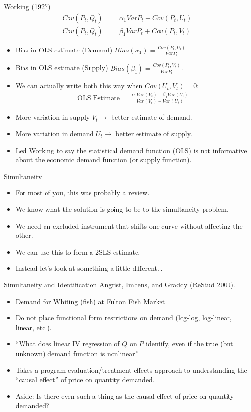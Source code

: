 \documentclass[xcolor=pdftex,dvipsnames,table,mathserif]{beamer}
\begin{document}
\begin{frame}{Working (1927)}
\begin{eqnarray*}
Cov(P_t, Q_t) &=& \alpha_1 Var P_t + Cov (P_t,U_t)\\
Cov(P_t, Q_t) &=& \beta_1 Var P_t + Cov (P_t,V_t)
\end{eqnarray*}
\begin{itemize}
\item Bias in OLS estimate (Demand) $Bias(\alpha_1) = \frac{Cov(P_t,U_t)}{Var P_t}$.
\item Bias in OLS estimate (Supply) $Bias(\beta_1) = \frac{Cov(P_t,V_t)}{Var P_t}$.
\item We can actually write both this way when $Cov(U_t,V_t) = 0$:
\begin{eqnarray*}
\text{OLS Estimate }= \frac{\alpha_1 Var(V_t) + \beta_1 Var (U_t)}{Var (V_t) + Var (U_t)}
\end{eqnarray*}
\item More variation in supply $V_t \rightarrow$ better estimate of demand.
\item More variation in demand $U_t \rightarrow$ better estimate of supply.
\item Led Working to say the \alert{statistical demand function} (OLS) is not informative about the economic demand function (or supply function).
\end{itemize}
\end{frame}

\begin{frame}{Simultaneity}
\begin{itemize}
\item For most of you, this was probably a review.
\item We know what the solution is going to be to the simultaneity problem.
\item We need an \alert{excluded instrument} that shifts one curve without affecting the other.
\item We can use this to form a 2SLS estimate.
\item Instead let's look at something a little different...
\end{itemize}
\end{frame}


\begin{frame}{Simultaneity and Identification}
Angrist, Imbens, and Graddy (ReStud 2000).
\begin{itemize}
\item Demand for Whiting (fish) at Fulton Fish Market
\item Do not place functional form restrictions on demand (log-log, log-linear, linear, etc.).
\item ``What does linear IV regression of $Q$ on $P$ identify, even if the true (but unknown) demand function is nonlinear''
\item Takes a program evaluation/treatment effects approach to understanding the ``causal effect'' of price on quantity demanded.
\item Aside: Is there even such a thing as the causal effect of price on quantity demanded?
\end{itemize}
\end{frame}
\end{document}
